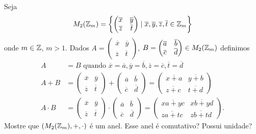 \documentclass[12pt]{exam}
\begin{document}
    \questao{} Seja
    \[
        M_2(\mathbb{Z}_m) = \left\{\begin{pmatrix}
            \overline{x} & \overline{y}\\\overline{z} & \overline{t}
        \end{pmatrix} \mid \overline{x}, \overline{y}, \overline{z}, \overline{t} \in \mathbb{Z}_m \right\}
    \]
    onde $m \in \mathbb{Z}$, $m > 1$.
    Dados $A = \begin{pmatrix}
            \overline{x} & \overline{y}\\\overline{z} & \overline{t}
        \end{pmatrix}$, $B = \begin{pmatrix}
            \overline{a} & \overline{b}\\\overline{c} & \overline{d}
        \end{pmatrix} \in M_2(\mathbb{Z}_m)$ definimos
    \begin{align*}
        A &= B \mbox{ quando } \overline{x} = \overline{a}, \overline{y} = \overline{b}, \overline{z} = \overline{c}, \overline{t} = \overline{d}\\
        A + B &= \begin{pmatrix}
            \overline{x}& \overline{y}\\\overline{z} &\overline{t}
        \end{pmatrix} + \begin{pmatrix}
            \overline{a} & \overline{b}\\\overline{c} & \overline{d}
        \end{pmatrix} = \begin{pmatrix}
            \overline{x + a} & \overline{y + b}\\\overline{z + c} &\overline{t + d}
        \end{pmatrix}\\
        A \cdot B &= \begin{pmatrix}
            \overline{x}& \overline{y}\\\overline{z} &\overline{t}
        \end{pmatrix} \cdot \begin{pmatrix}
            \overline{a} & \overline{b}\\\overline{c} & \overline{d}
        \end{pmatrix} = \begin{pmatrix}
            \overline{xa + yc} & \overline{xb + yd}\\\overline{za + tc} & \overline{zb + td}
        \end{pmatrix}.
    \end{align*}
    Mostre que $(M_2(\mathbb{Z}_m), + , \cdot)$ é um anel. Esse anel é comutativo? Possui unidade?
\end{document}
